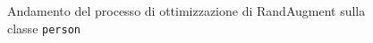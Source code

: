 \begin{figure}[]
    \begin{minipage}{.5\linewidth}
        \centering
    \end{minipage}%
    \begin{minipage}{.5\linewidth}
        \centering
    \end{minipage}
    \centering
    \caption{Andamento del processo di ottimizzazione di RandAugment sulla classe \texttt{person}}
    \label{fig:RA_2}
\end{figure}

